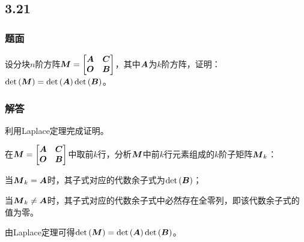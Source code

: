 \documentclass[10pt,xcolor=svgnames]{beamer} %
\begin{document}
\subsection*{3.21}
\begin{frame}
    \frametitle{题面}
    设分块\(n\)阶方阵\(\matm=\begin{bmatrix}\mata&\matc\\\mato&\matb\end{bmatrix}\)，其中\(\mata\)为\(k\)阶方阵，证明：\(\det{\matm}=\det{\mata}\det{\matb}\)。
\end{frame}
\begin{frame}
    \frametitle{解答}
    利用Laplace定理完成证明。

    在\(\matm=\begin{bmatrix}\mata&\matc\\\mato&\matb\end{bmatrix}\)中取前\(k\)行，分析\(\matm\)中前\(k\)行元素组成的\(k\)阶子矩阵\(\matm_k\)：
    \pause

    当\(\matm_k=\mata\)时，其子式对应的代数余子式为\(\det{\matb}\)；

    当\(\matm_k\neq\mata\)时，其子式对应的代数余子式中必然存在全零列，即该代数余子式的值为零。

    由Laplace定理可得\(\det{\matm}=\det{\mata}\det{\matb}\)。
\end{frame}
\end{document}
